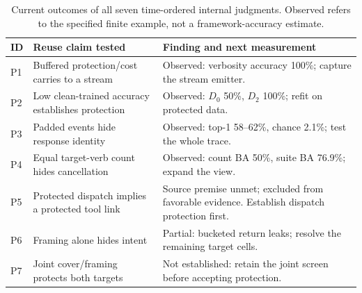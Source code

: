 \begin{table}[t]\centering\footnotesize
\caption{Current outcomes of all seven time-ordered internal judgments. Observed refers to the specified finite example, not a framework-accuracy estimate.}\label{tab:r28-judgments}
\begin{tabularx}{\columnwidth}{@{}l>{\raggedright\arraybackslash}p{}Y@{}}\toprule
ID & Reuse claim tested & Finding and next measurement\\\midrule
P1 & Buffered protection/cost carries to a stream & Observed: verbosity accuracy 100\%; capture the stream emitter.\\
P2 & Low clean-trained accuracy establishes protection & Observed: $D_0$ 50\%, $D_2$ 100\%; refit on protected data.\\
P3 & Padded events hide response identity & Observed: top-1 58--62\%, chance 2.1\%; test the whole trace.\\
P4 & Equal target-verb count hides cancellation & Observed: count BA 50\%, suite BA 76.9\%; expand the view.\\
P5 & Protected dispatch implies a protected tool link & Source premise unmet; excluded from favorable evidence. Establish dispatch protection first.\\
P6 & Framing alone hides intent & Partial: bucketed return leaks; resolve the remaining target cells.\\
P7 & Joint cover/framing protects both targets & Not established: retain the joint screen before accepting protection.\\
\bottomrule\end{tabularx}
\end{table}
